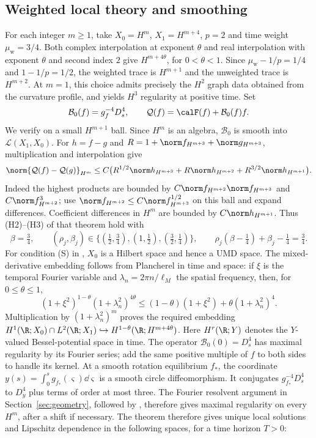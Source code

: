 \subsection{Weighted local theory and smoothing}
For each integer $m\ge1$, take $X_0=H^m$, $X_1=H^{m+4}$, $p=2$ and time weight $\mu_{\mathrm w}=3/4$. Both complex interpolation at exponent $\theta$ and real interpolation with exponent $\theta$ and second index $2$ give $H^{m+4\theta}$, for $0<\theta<1$. Since $\mu_{\mathrm w}-1/p=1/4$ and $1-1/p=1/2$, the weighted trace is $H^{m+1}$ and the unweighted trace is $H^{m+2}$. At $m=1$, this choice admits precisely the $H^2$ graph data obtained from the curvature profile, and yields $H^3$ regularity at positive time. Set
\[
 \mathcal B_0(f)=g_f^{-4}D_s^4,\qquad
 \mathcal Q(f)=\calF(f)+\mathcal B_0(f)f.
\]
We verify \cite[Theorem~1.2]{PSW} on a small $H^{m+1}$ ball. Since $H^m$ is an algebra, $\mathcal B_0$ is smooth into $\mathcal L(X_1,X_0)$. For $h=f-g$ and $R=1+\norm f_{H^{m+3}}+\norm g_{H^{m+3}}$, multiplication and interpolation give
\begin{equation}\label{eq:weighted-products}
 \norm{\mathcal Q(f)-\mathcal Q(g)}_{H^m}
 \le C\big(R^{1/2}\norm h_{H^{m+3}}+R\norm h_{H^{m+2}}
                 +R^{3/2}\norm h_{H^{m+1}}\big).
\end{equation}
Indeed the highest products are bounded by
$C\norm f_{H^{m+2}}\norm f_{H^{m+3}}$ and $C\norm f_{H^{m+2}}^3$;
use $\norm f_{H^{m+2}}\le C\norm f_{H^{m+3}}^{1/2}$ on this ball and expand differences. Coefficient differences in $H^m$ are bounded by $C\norm h_{H^{m+1}}$.
Thus (H2)--(H3) of that theorem hold with
\[
 \beta=\tfrac34,\qquad
 (\rho_j,\beta_j)\in\{(\tfrac12,\tfrac34),(1,\tfrac12),(\tfrac32,\tfrac14)\},
 \qquad \rho_j(\beta-\tfrac14)+\beta_j-\tfrac14=\tfrac34.
\]
For condition (S) in \cite{PSW}, $X_0$ is a Hilbert space and hence a UMD space. The mixed-derivative embedding follows from Plancherel in time and space: if $\xi$ is the temporal Fourier variable and $\lambda_n=2\pi n/\ell_M$ the spatial frequency, then, for $0\le\theta\le1$,
\[
 (1+\xi^2)^{1-\theta}(1+\lambda_n^2)^{4\theta}
 \le(1-\theta)(1+\xi^2)+\theta(1+\lambda_n^2)^4.
\]
Multiplication by $(1+\lambda_n^2)^m$ proves the required embedding $H^1(\R;X_0)\cap L^2(\R;X_1)\hookrightarrow H^{1-\theta}(\R;H^{m+4\theta})$. Here $H^r(\R;Y)$ denotes the $Y$-valued Bessel-potential space in time. The operator $\mathcal B_0(0)=D_s^4$ has maximal regularity by its Fourier series; add the same positive multiple of $f$ to both sides to handle its kernel. At a smooth rotation equilibrium $f_*$, the coordinate $y(s)=\int_0^s g_{f_*}(\varsigma)\dd\varsigma$ is a smooth circle diffeomorphism. It conjugates $g_{f_*}^{-4}D_s^4$ to $D_y^4$ plus terms of order at most three. The Fourier resolvent argument in Section~\ref{sec:geometry}, followed by \cite{deSimon}, therefore gives maximal regularity on every $H^m$, after a shift if necessary. The theorem therefore gives unique local solutions and Lipschitz dependence in the following spaces, for a time horizon $T>0$:

